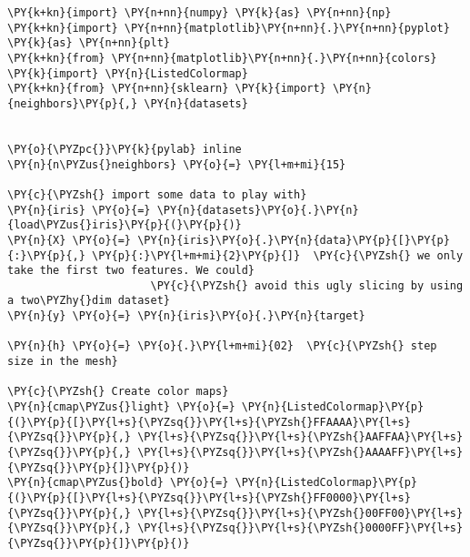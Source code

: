 












    
    
    

    

{\par%
\vspace{-1\baselineskip}%
}%
\begin{notebookcell}[]%
\begin{addmargin}[\cellleftmargin]{0em}%
{\smaller%
\par%
%
\vspace{-1\smallerfontscale}%
\begin{Verbatim}[commandchars=\\\{\}]
\PY{k+kn}{import} \PY{n+nn}{numpy} \PY{k}{as} \PY{n+nn}{np}
\PY{k+kn}{import} \PY{n+nn}{matplotlib}\PY{n+nn}{.}\PY{n+nn}{pyplot} \PY{k}{as} \PY{n+nn}{plt}
\PY{k+kn}{from} \PY{n+nn}{matplotlib}\PY{n+nn}{.}\PY{n+nn}{colors} \PY{k}{import} \PY{n}{ListedColormap}
\PY{k+kn}{from} \PY{n+nn}{sklearn} \PY{k}{import} \PY{n}{neighbors}\PY{p}{,} \PY{n}{datasets}


\PY{o}{\PYZpc{}}\PY{k}{pylab} inline
\PY{n}{n\PYZus{}neighbors} \PY{o}{=} \PY{l+m+mi}{15}

\PY{c}{\PYZsh{} import some data to play with}
\PY{n}{iris} \PY{o}{=} \PY{n}{datasets}\PY{o}{.}\PY{n}{load\PYZus{}iris}\PY{p}{(}\PY{p}{)}
\PY{n}{X} \PY{o}{=} \PY{n}{iris}\PY{o}{.}\PY{n}{data}\PY{p}{[}\PY{p}{:}\PY{p}{,} \PY{p}{:}\PY{l+m+mi}{2}\PY{p}{]}  \PY{c}{\PYZsh{} we only take the first two features. We could}
                      \PY{c}{\PYZsh{} avoid this ugly slicing by using a two\PYZhy{}dim dataset}
\PY{n}{y} \PY{o}{=} \PY{n}{iris}\PY{o}{.}\PY{n}{target}

\PY{n}{h} \PY{o}{=} \PY{o}{.}\PY{l+m+mi}{02}  \PY{c}{\PYZsh{} step size in the mesh}

\PY{c}{\PYZsh{} Create color maps}
\PY{n}{cmap\PYZus{}light} \PY{o}{=} \PY{n}{ListedColormap}\PY{p}{(}\PY{p}{[}\PY{l+s}{\PYZsq{}}\PY{l+s}{\PYZsh{}FFAAAA}\PY{l+s}{\PYZsq{}}\PY{p}{,} \PY{l+s}{\PYZsq{}}\PY{l+s}{\PYZsh{}AAFFAA}\PY{l+s}{\PYZsq{}}\PY{p}{,} \PY{l+s}{\PYZsq{}}\PY{l+s}{\PYZsh{}AAAAFF}\PY{l+s}{\PYZsq{}}\PY{p}{]}\PY{p}{)}
\PY{n}{cmap\PYZus{}bold} \PY{o}{=} \PY{n}{ListedColormap}\PY{p}{(}\PY{p}{[}\PY{l+s}{\PYZsq{}}\PY{l+s}{\PYZsh{}FF0000}\PY{l+s}{\PYZsq{}}\PY{p}{,} \PY{l+s}{\PYZsq{}}\PY{l+s}{\PYZsh{}00FF00}\PY{l+s}{\PYZsq{}}\PY{p}{,} \PY{l+s}{\PYZsq{}}\PY{l+s}{\PYZsh{}0000FF}\PY{l+s}{\PYZsq{}}\PY{p}{]}\PY{p}{)}


\end{Verbatim}}
\end{addmargin}
\end{notebookcell}
